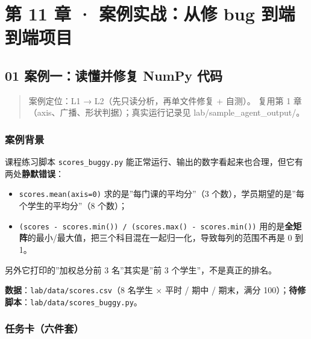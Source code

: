 \chapter{第 11 章 · 案例实战：从修 bug
到端到端项目}\label{ux7b2c-11-ux7ae0-ux6848ux4f8bux5b9eux6218ux4eceux4fee-bug-ux5230ux7aefux5230ux7aefux9879ux76ee}

\section{01 案例一：读懂并修复 NumPy
代码}\label{ux6848ux4f8bux4e00ux8bfbux61c2ux5e76ux4feeux590d-numpy-ux4ee3ux7801}

\begin{quote}
案例定位：L1 → L2（先只读分析，再单文件修复 + 自测）。 复用第 1
章（axis、广播、形状判据）；真实运行记录见 lab/sample\_agent\_output/。
\end{quote}

\subsection{案例背景}\label{ux6848ux4f8bux80ccux666f-4}

课程练习脚本 \texttt{scores\_buggy.py}
能正常运行、输出的数字看起来也合理，但它有两处\textbf{静默错误}：

\begin{itemize}
\tightlist
\item
  \texttt{scores.mean(axis=0)} 求的是''每门课的平均分''（3
  个数），学员期望的是''每个学生的平均分''（8 个数）；
\item
  \texttt{(scores\ -\ scores.min())\ /\ (scores.max()\ -\ scores.min())}
  用的是\textbf{全矩阵}的最小/最大值，把三个科目混在一起归一化，导致每列的范围不再是
  0 到 1。
\end{itemize}

另外它打印的''加权总分前 3 名''其实是''前 3 个学生''，不是真正的排名。

\textbf{数据}：\texttt{lab/data/scores.csv}（8 名学生 × 平时 / 期中 /
期末，满分
100）；\textbf{待修脚本}：\texttt{lab/data/scores\_buggy.py}。

\subsection{任务卡（六件套）}\label{ux4efbux52a1ux5361ux516dux4ef6ux5957}

